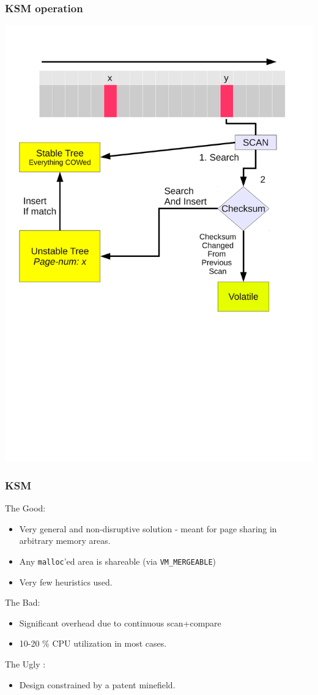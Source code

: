 \documentclass{beamer}
\begin{document}
\begin{frame}
  \frametitle{KSM operation}\vspace{-13mm}
 \includegraphics[scale=0.5]{KSM_operation.pdf}
\end{frame}

\begin{frame}
\frametitle{KSM}
\alert{The Good:}  
  \begin{itemize}
  \item Very general and non-disruptive solution - meant for page sharing in arbitrary memory areas.
  \item Any \texttt{malloc}'ed area is shareable (via \texttt{VM\_MERGEABLE})
  \item Very few heuristics used.
  \end{itemize}
\alert{The Bad: }
\begin{itemize}
  \item Significant overhead due to continuous scan+compare
  \item 10-20 \% CPU utilization in most cases.
\end{itemize}
\alert {The Ugly :}
\begin{itemize}
\item Design constrained by a patent minefield.
\end{itemize}

\end{frame}
\end{document}
